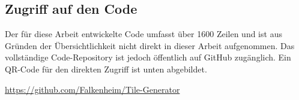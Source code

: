 \begin{appendices}
    \chapter{Zugriff auf den Code}
    \label{app:code}
    Der für diese Arbeit entwickelte Code umfasst über 1600 Zeilen und ist aus Gründen der Übersichtlichkeit nicht direkt in dieser Arbeit aufgenommen. Das vollständige Code-Repository ist jedoch öffentlich auf GitHub zugänglich. Ein QR-Code für den direkten Zugriff ist unten abgebildet.
    
    \begin{center}
        \vspace{1cm} %
        \url{https://github.com/Falkenheim/Tile-Generator}
        \par %
        \vspace{0.5cm} %
        \vspace{1cm} %
    \end{center}
    
    
\end{appendices}
    